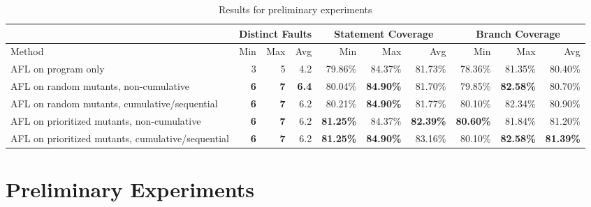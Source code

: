 \begin{table*}
  \renewcommand{\arraystretch}{1.3}
\caption{Results for preliminary experiments}
  
  \centering
  \begin{tabular}{l||r|r|r||r|r|r||r|r|r}
    & \multicolumn{3}{|c||}{Distinct Faults} & \multicolumn{3}{|c||}{Statement Coverage} &
                                                                    \multicolumn{3}{|c}{Branch Coverage} \\
    \hline
  Method & Min & Max  & Avg & Min & Max & Avg
                                                                  
  & Min & Max & Avg \\
    \hline
    \hline
  AFL on program only & 3 & 5 & 4.2 & 79.86\% & 84.37\% & 81.73\% &
                                                                    78.36\%
                                  & 81.35\% & 80.40\%\\
    \hline
    \hline
  AFL on random mutants, non-cumulative  & {\bf 6} & {\bf 7} & {\bf 6.4} & 80.04\% &
                                                                   {\bf
                                                                                     84.90\%}
                      & 81.70\% & 79.85\% & {\bf 82.58\%} & 80.70\%\\
  \hline
  AFL on random mutants, cumulative/sequential & {\bf 6} & {\bf 7} & 6.2 & 80.21\%
                                                               &
                                                                 {\bf 84.90\%}
                      & 81.77\%
                            & 80.10\% & 82.34\% & 80.90\%\\
    \hline
    \hline
    AFL on prioritized mutants, non-cumulative  & {\bf 6} & {\bf 7} & 6.2 &
                                                                {\bf 81.25\%}
               & 84.37\% & {\bf 82.39\%} & {\bf 80.60\%} & 81.84\% & 81.20\% \\
    \hline
    AFL on prioritized mutants, cumulative/sequential  & {\bf 6} &
                                                                   {\bf 7} & 6.2 &
    {\bf 81.25\%} & {\bf 84.90\%} & 83.16\% & 80.10\% & {\bf 82.58\%} & {\bf 81.39\%}\\    
  \hline
  \end{tabular}
  \label{tab:prelim}

\end{table*}

\section{Preliminary Experiments}



